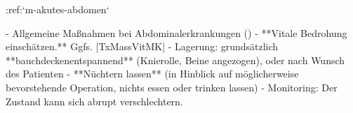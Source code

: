 :ref:`m-akutes-abdomen`%
\begin{itemize}
  -   Allgemeine Maßnahmen bei Abdominalerkrankungen
  ()
  -   **Vitale Bedrohung einschätzen.** Ggfs.
  |TxMassVitMK|
  -   Lagerung: grundsätzlich **bauchdeckenentspannend**
  (Knierolle, Beine angezogen), oder nach Wunsch des Patienten
  -   **Nüchtern lassen** (in Hinblick auf möglicherweise
  bevorstehende Operation, nichts essen oder trinken lassen)
  -   Monitoring: Der Zustand kann sich abrupt
  verschlechtern.
\end{itemize}